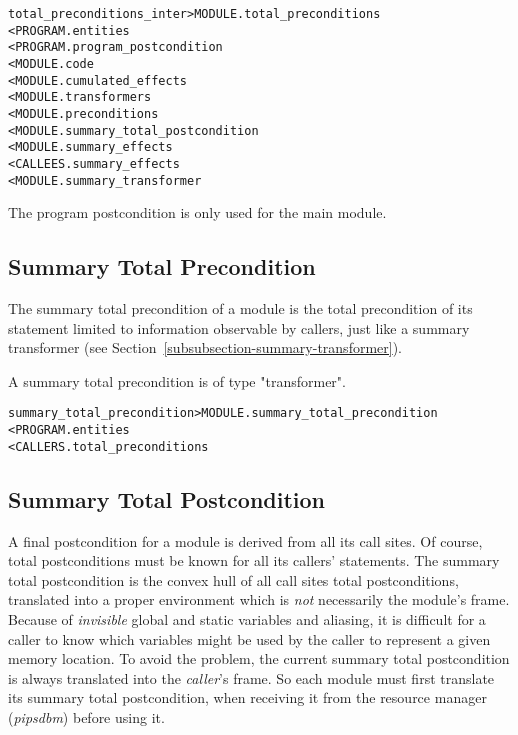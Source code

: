 \documentclass[a4paper]{report}
\newenvironment{PipsMake}{\begin{alltt}}{\end{alltt}}
\begin{document}
\begin{PipsMake}

total_preconditions_inter        > MODULE.total_preconditions
        < PROGRAM.entities
        < PROGRAM.program_postcondition
        < MODULE.code
        < MODULE.cumulated_effects
        < MODULE.transformers
        < MODULE.preconditions
        < MODULE.summary_total_postcondition
        < MODULE.summary_effects
        < CALLEES.summary_effects
        < MODULE.summary_transformer
\end{PipsMake}

The program postcondition is only used for the main module.

\subsection{Summary Total Precondition}

The summary total precondition of a module is the total precondition of
its statement limited to information observable by callers, just like a
summary transformer (see Section~\ref{subsubsection-summary-transformer}).

A summary total precondition is of type "transformer".

\begin{PipsMake}
summary_total_precondition            > MODULE.summary_total_precondition
        < PROGRAM.entities
        < CALLERS.total_preconditions
\end{PipsMake}

\subsection{Summary Total Postcondition}

A final postcondition for a module is derived from all its call
sites. Of course, total postconditions must be known for all its callers'
statements.  The summary total postcondition is the convex hull of all call
sites total postconditions, translated into a proper environment which is {\em
not} necessarily the module's frame. Because of {\em invisible} global
and static variables and aliasing, it is difficult for a caller to know which
variables might be used by the caller to represent a given memory
location. To avoid the problem, the current summary total postcondition is
always translated into the {\em caller}'s frame. So each module must
first translate its summary total postcondition, when receiving it from the
resource manager ({\em pipsdbm}) before using it.
\end{document}
